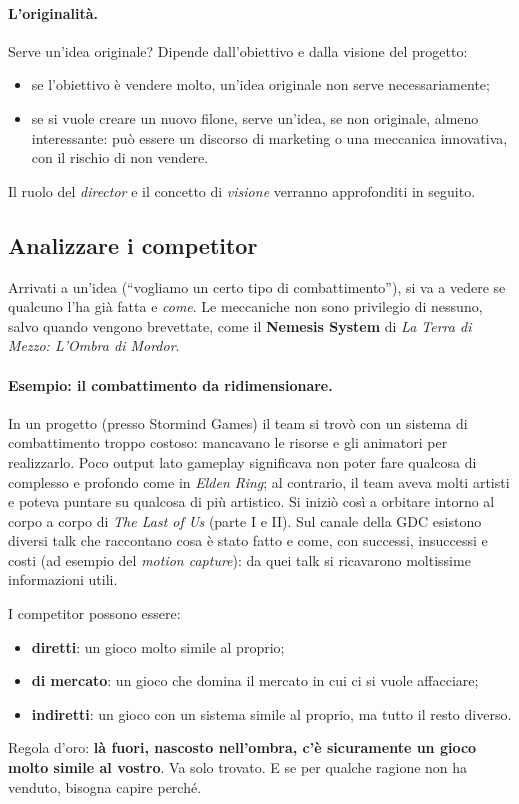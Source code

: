 \paragraph{L'originalità.} Serve un'idea originale? Dipende dall'obiettivo e
dalla visione del progetto:
\begin{itemize}
  \item se l'obiettivo è vendere molto, un'idea originale non serve
        necessariamente;
  \item se si vuole creare un nuovo filone, serve un'idea, se non originale,
        almeno interessante: può essere un discorso di marketing o una
        meccanica innovativa, con il rischio di non vendere.
\end{itemize}
Il ruolo del \emph{director} e il concetto di \emph{visione} verranno
approfonditi in seguito.

\subsection{Analizzare i competitor}

Arrivati a un'idea (``vogliamo un certo tipo di combattimento''), si va a
vedere se qualcuno l'ha già fatta e \emph{come}. Le meccaniche non sono
privilegio di nessuno, salvo quando vengono brevettate, come il
\textbf{Nemesis System} di \emph{La Terra di Mezzo: L'Ombra di Mordor}.

\paragraph{Esempio: il combattimento da ridimensionare.} In un progetto
(presso Stormind Games) il team si trovò con un sistema di combattimento
troppo costoso: mancavano le risorse e gli animatori per realizzarlo. Poco
output lato gameplay significava non poter fare qualcosa di complesso e
profondo come in \emph{Elden Ring}; al contrario, il team aveva molti
artisti e poteva puntare su qualcosa di più artistico. Si iniziò così a
orbitare intorno al corpo a corpo di \emph{The Last of Us} (parte I e II).
Sul canale della GDC esistono diversi talk che raccontano cosa è stato fatto
e come, con successi, insuccessi e costi (ad esempio del \emph{motion
capture}): da quei talk si ricavarono moltissime informazioni utili.

I competitor possono essere:
\begin{itemize}
  \item \textbf{diretti}: un gioco molto simile al proprio;
  \item \textbf{di mercato}: un gioco che domina il mercato in cui ci si vuole
        affacciare;
  \item \textbf{indiretti}: un gioco con un sistema simile al proprio, ma
        tutto il resto diverso.
\end{itemize}
Regola d'oro: \textbf{là fuori, nascosto nell'ombra, c'è sicuramente un gioco
molto simile al vostro}. Va solo trovato. E se per qualche ragione non ha
venduto, bisogna capire perché.

